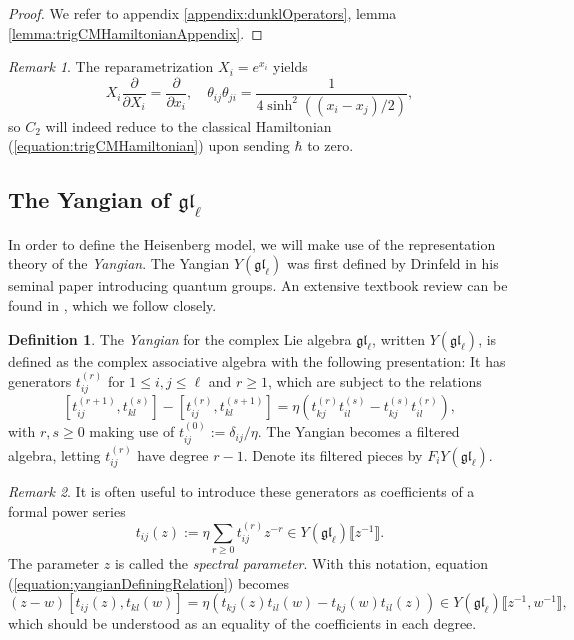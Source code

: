 \documentclass[11pt]{report}
\theoremstyle{definition}
\newtheorem{definition}[theorem]{Definition}
\theoremstyle{remark}
\newtheorem*{remark}{Remark}
\theoremstyle{remark}
\begin{document}
\begin{proof}
We refer to appendix \ref{appendix:dunklOperators}, lemma \ref{lemma:trigCMHamiltonianAppendix}.
\end{proof}

\begin{remark}
The reparametrization $X_i = e^{x_i}$ yields
\begin{equation*}
X_i \frac{\partial}{\partial X_i} = \frac{\partial}{\partial x_i}, \quad \theta_{ij} \theta_{ji} = \frac{1}{4\sinh^2((x_i-x_j)/2)},
\end{equation*}
so $C_2$ will indeed reduce to the classical Hamiltonian (\ref{equation:trigCMHamiltonian}) upon sending $\hbar$ to zero.
\end{remark}

\subsection{The Yangian of $\mathfrak{gl}_\ell$}

In order to define the Heisenberg model, we will make use of the representation theory of the \emph{Yangian}. The Yangian $Y(\mathfrak{gl}_\ell)$ was first defined by Drinfeld in his seminal paper \cite{article:drinfeld:1985} introducing quantum groups. An extensive textbook review can be found in \cite{book:molev}, which we follow closely.

\begin{definition}
The \emph{Yangian} for the complex Lie algebra $\mathfrak{gl}_\ell$, written $Y(\mathfrak{gl}_\ell)$, is defined as the complex associative algebra with the following presentation: It has generators $t_{ij}^{(r)}$ for $1 \leq i,j \leq \ell$ and $r \geq 1$, which are subject to the relations
\begin{equation}\label{equation:yangianDefiningRelation}
[t_{ij}^{(r+1)},t_{kl}^{(s)}] - [t_{ij}^{(r)},t_{kl}^{(s+1)}] = \eta(t_{kj}^{(r)} t_{il}^{(s)} - t_{kj}^{(s)} t_{il}^{(r)}),
\end{equation}
with $r,s \geq 0$ making use of $t_{ij}^{(0)} := \delta_{ij}/\eta$. The Yangian becomes a filtered algebra, letting $t_{ij}^{(r)}$ have degree $r-1$. Denote its filtered pieces by $F_i Y(\mathfrak{gl}_\ell)$.
\end{definition}

\begin{remark}
It is often useful to introduce these generators as coefficients of a formal power series
\begin{equation*}
t_{ij}(z) := \eta \sum_{r \geq 0} t_{ij}^{(r)} z^{-r} \in Y(\mathfrak{gl}_\ell)\llbracket z^{-1} \rrbracket.
\end{equation*}
The parameter $z$ is called the \emph{spectral parameter}. With this notation, equation (\ref{equation:yangianDefiningRelation}) becomes
\begin{equation}\label{equation:yangianDefiningRelationUV}
(z-w) [t_{ij}(z),t_{kl}(w)] = \eta(t_{kj}(z) t_{il}(w) - t_{kj}(w) t_{il}(z)) \in Y(\mathfrak{gl}_\ell)\llbracket z^{-1},w^{-1} \rrbracket,
\end{equation}
which should be understood as an equality of the coefficients in each degree.
\end{remark}
\end{document}
